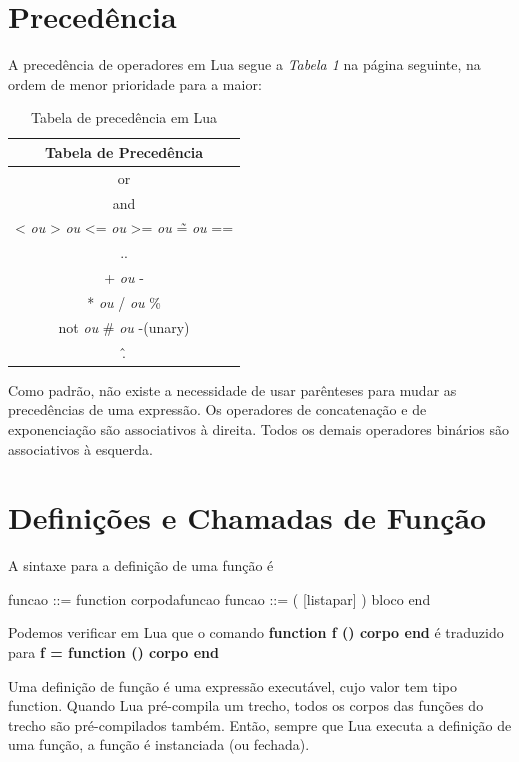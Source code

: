 \documentclass[
12pt, %
openright, %
oneside, %
a4paper, %
english, %
brazil, %
]{abntex2}
\begin{document}
\section{Precedência}
A precedência de operadores em Lua segue a \textit{Tabela 1} na página seguinte, na ordem de menor prioridade para a maior:
\begin{table}
\centering
\begin{tabular}{c|c|c|c|c|c}
\hline
\multicolumn{6}{|c|}{\textbf{Tabela de Precedência}} \\
\hline
\multicolumn{6}{|c|}{or} \\
\hline
\multicolumn{6}{|c|}{and} \\
\hline
\multicolumn{6}{|c|}{< \textit{ou} > \textit{ou} <= \textit{ou} >= \textit{ou} \~= \textit{ou} ==} \\
\hline
\multicolumn{6}{|c|}{..} \\
\hline
\multicolumn{6}{|c|}{+ \textit{ou} -} \\
\hline
\multicolumn{6}{|c|}{* \textit{ou} / \textit{ou} \%} \\
\hline
\multicolumn{6}{|c|}{not \textit{ou} \# \textit{ou} -(unary)} \\
\hline
\multicolumn{6}{|c|}{\^.} \\
\end{tabular}
\label{completa}
\caption{Tabela de precedência em Lua}
\end{table}

Como padrão, não existe a necessidade de usar parênteses para mudar as precedências de uma expressão. Os operadores de concatenação e de exponenciação são associativos à direita. Todos os demais operadores binários são associativos à esquerda.

\section{Definições e Chamadas de Função}
A sintaxe para a definição de uma função é

  funcao ::= function corpodafuncao
  funcao ::= ( [listapar] ) bloco end

Podemos verificar em Lua que o comando \textbf{function f () corpo end} é traduzido para \textbf{f = function () corpo end}

Uma definição de função é uma expressão executável, cujo valor tem tipo function. Quando Lua pré-compila um trecho, todos os corpos das funções do trecho são pré-compilados também. Então, sempre que Lua executa a definição de uma função, a função é instanciada (ou fechada).
\end{document}
